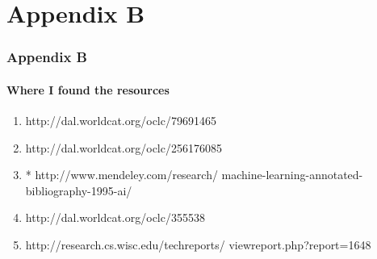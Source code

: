 \section{Appendix B}
\begin{frame}
    \frametitle{Appendix B}
    \framesubtitle{Where I found the resources}
    \begin{enumerate}
		\item http://dal.worldcat.org/oclc/79691465
		\item http://dal.worldcat.org/oclc/256176085
		\item * http://www.mendeley.com/research/ machine-learning-annotated-bibliography-1995-ai/
		\item http://dal.worldcat.org/oclc/355538
		\item http://research.cs.wisc.edu/techreports/ viewreport.php?report=1648
    \end{enumerate}
\end{frame}